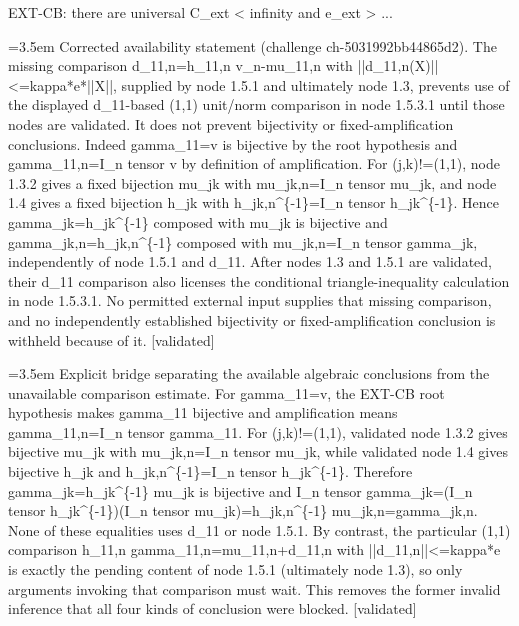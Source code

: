 \documentclass{article}
\newcommand{\step}[1]{\par\noindent\hangindent=3.5em\hangafter=1%
  \makebox[3.5em][l]{\textbf{#1.}}}
\newcommand{\steptag}[1]{\hfill{\small\textsf{[#1]}}}
\begin{document}
\begin{proofbox}{EXT-CB: there are universal C\_ext < infinity and e\_ext > ...}
\step{1.5.3.1.1} Corrected availability statement (challenge ch-5031992bb44865d2). The missing comparison d\_11,n=h\_11,n v\_n-mu\_11,n with ||d\_11,n(X)||<=kappa*e*||X||, supplied by node 1.5.1 and ultimately node 1.3, prevents use of the displayed d\_11-based (1,1) unit/norm comparison in node 1.5.3.1 until those nodes are validated. It does not prevent bijectivity or fixed-amplification conclusions. Indeed gamma\_11=v is bijective by the root hypothesis and gamma\_11,n=I\_n tensor v by definition of amplification. For (j,k)!=(1,1), node 1.3.2 gives a fixed bijection mu\_jk with mu\_jk,n=I\_n tensor mu\_jk, and node 1.4 gives a fixed bijection h\_jk with h\_jk,n\textasciicircum{}\{-1\}=I\_n tensor h\_jk\textasciicircum{}\{-1\}. Hence gamma\_jk=h\_jk\textasciicircum{}\{-1\} composed with mu\_jk is bijective and gamma\_jk,n=h\_jk,n\textasciicircum{}\{-1\} composed with mu\_jk,n=I\_n tensor gamma\_jk, independently of node 1.5.1 and d\_11. After nodes 1.3 and 1.5.1 are validated, their d\_11 comparison also licenses the conditional triangle-inequality calculation in node 1.5.3.1. No permitted external input supplies that missing comparison, and no independently established bijectivity or fixed-amplification conclusion is withheld because of it. \steptag{validated} \\[6pt]
\step{1.5.3.1.1.1} Explicit bridge separating the available algebraic conclusions from the unavailable comparison estimate. For gamma\_11=v, the EXT-CB root hypothesis makes gamma\_11 bijective and amplification means gamma\_11,n=I\_n tensor gamma\_11. For (j,k)!=(1,1), validated node 1.3.2 gives bijective mu\_jk with mu\_jk,n=I\_n tensor mu\_jk, while validated node 1.4 gives bijective h\_jk and h\_jk,n\textasciicircum{}\{-1\}=I\_n tensor h\_jk\textasciicircum{}\{-1\}. Therefore gamma\_jk=h\_jk\textasciicircum{}\{-1\} mu\_jk is bijective and I\_n tensor gamma\_jk=(I\_n tensor h\_jk\textasciicircum{}\{-1\})(I\_n tensor mu\_jk)=h\_jk,n\textasciicircum{}\{-1\} mu\_jk,n=gamma\_jk,n. None of these equalities uses d\_11 or node 1.5.1. By contrast, the particular (1,1) comparison h\_11,n gamma\_11,n=mu\_11,n+d\_11,n with ||d\_11,n||<=kappa*e is exactly the pending content of node 1.5.1 (ultimately node 1.3), so only arguments invoking that comparison must wait. This removes the former invalid inference that all four kinds of conclusion were blocked. \steptag{validated} \\[4pt]

\end{proofbox}
\end{document}
